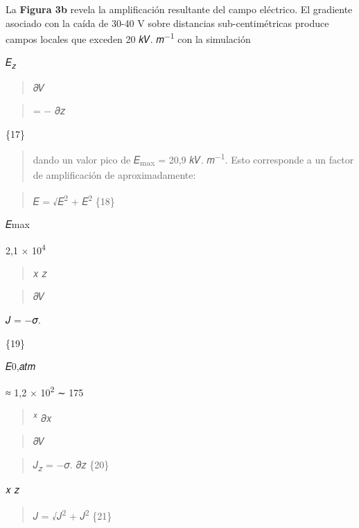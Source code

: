 \documentclass[
]{article}
\begin{document}
La \textbf{Figura 3b} revela la amplificación resultante del campo
eléctrico. El gradiente asociado con la caída de 30-40 V sobre
distancias sub-centimétricas produce campos locales que exceden 20 𝑘𝑉.
𝑚\textsuperscript{−1} con la simulación

𝐸\textsubscript{𝑧}

\begin{quote}
𝜕𝑉
\end{quote}

\begin{quote}
= − 𝜕𝑧
\end{quote}

\{17\}

\begin{quote}
dando un valor pico de 𝐸\textsubscript{max} = 20,9 𝑘𝑉.
𝑚\textsuperscript{−1}. Esto corresponde a un factor de amplificación de
aproximadamente:
\end{quote}

\begin{quote}
\textbar 𝐸\textbar{} = √𝐸\textsuperscript{2} + 𝐸\textsuperscript{2}
\{18\}
\end{quote}

𝐸max

2,1 × 10\textsuperscript{4}

\begin{quote}
𝑥 𝑧
\end{quote}

\begin{quote}
𝜕𝑉
\end{quote}

𝐽 = −𝜎.

\{19\}

\textbar 𝐸0,𝑎𝑡𝑚\textbar{}

≈ 1,2 × 10\textsuperscript{2} ∼ 175

\begin{quote}
\textsuperscript{𝑥} 𝜕𝑥
\end{quote}

\begin{quote}
𝜕𝑉
\end{quote}

\begin{quote}
𝐽\textsubscript{𝑧} = −𝜎. 𝜕𝑧 \{20\}
\end{quote}

𝑥 𝑧

\begin{quote}
\textbar 𝐽\textbar{} = √𝐽\textsuperscript{2} + 𝐽\textsuperscript{2}
\{21\}
\end{quote}
\end{document}
